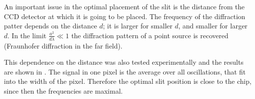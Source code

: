 An important issue in the optimal placement of the slit is the distance from the CCD detector at which it is going to be placed. The frequency of the diffraction patter depends on the distance $d$; it is larger for smaller $d$, and smaller for larger $d$. In the limit $\frac{a^2}{d\lambda} \ll 1$ the diffraction pattern of a point source is recovered (Fraunhofer diffraction in the far field).

This dependence on the distance was also tested experimentally and the results are shown in .
The signal in one pixel is the average over all oscillations, that fit into the width of the pixel. Therefore the optimal slit position is close to the chip, since then the frequencies are maximal.

